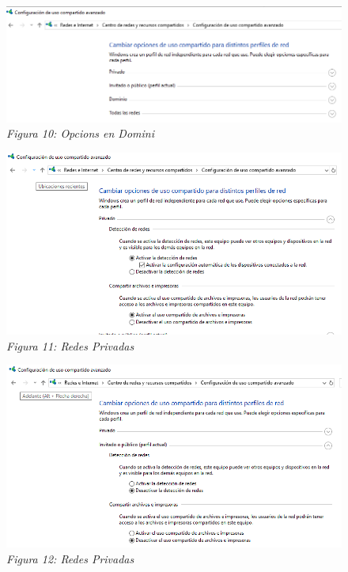 \documentclass[
  a4paper,
]{article}
\begin{document}
\begin{figure}
\centering
\includegraphics{png/CambiarOpcionesDeUsoCompartido.png}
\caption{\emph{Figura 10: Opcions en Domini }}
\end{figure}

\begin{figure}
\centering
\includegraphics{png/OpcionesDeteccionRedesPrivada.png}
\caption{\emph{Figura 11: Redes Privadas}}
\end{figure}

\begin{figure}
\centering
\includegraphics{png/OpcionesDeteccionRedesPublica.png}
\caption{\emph{Figura 12: Redes Privadas}}
\end{figure}
\end{document}
